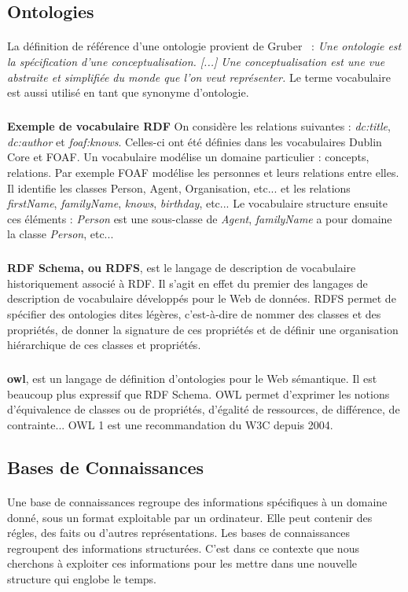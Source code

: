 \subsection{Ontologies}
\paragraph{}
La définition de référence d’une ontologie provient de Gruber~\cite{gruber1995}  : {\it Une ontologie est la spécification d’une conceptualisation. [...] Une conceptualisation est une vue abstraite et simplifiée du monde que l’on veut représenter.} Le terme vocabulaire est aussi utilisé en tant que synonyme d’ontologie.
\subparagraph{}
\textbf{Exemple de vocabulaire RDF} On considère les relations suivantes : \textit{dc:title}, \textit{dc:author} et \textit{foaf:knows}. Celles-ci ont été définies dans les vocabulaires Dublin Core et FOAF. Un vocabulaire modélise un domaine particulier : concepts, relations. Par exemple FOAF modélise les personnes et leurs relations entre elles. Il identifie les classes Person, Agent, Organisation, etc... et les relations \textit{firstName}, \textit{familyName}, \textit{knows}, \textit{birthday}, etc... Le vocabulaire structure ensuite ces  éléments : \textit{Person} est une sous-classe de \textit{Agent}, \textit{familyName} a pour domaine la classe \textit{Person}, etc...
\subparagraph{}
\textbf{RDF Schema, ou RDFS}, est le langage de description de vocabulaire historiquement associé à RDF. Il s'agit en effet du premier des langages de description de vocabulaire développés pour le Web de données. RDFS permet de spécifier des ontologies dites légères, c'est-à-dire de nommer des classes et des propriétés, de donner la signature de ces propriétés et de définir une organisation hiérarchique de ces classes et propriétés.
\subparagraph{}
\textbf{\gls{owl}}, est un langage de définition d'ontologies pour le Web sémantique. Il est beaucoup plus expressif que RDF Schema. OWL permet d'exprimer les notions d'équivalence de classes ou de propriétés, d'égalité de ressources, de différence, de contrainte... OWL 1 est une recommandation du W3C depuis 2004.
\newpage
\subsection{Bases de Connaissances}
\paragraph{}
Une base de connaissances regroupe des informations spécifiques à un domaine donné, sous un format exploitable par un ordinateur. Elle peut contenir des régles, des faits ou d'autres représentations. Les bases de connaissances regroupent des informations structurées. C’est dans ce contexte que nous cherchons à exploiter ces informations pour les mettre dans une nouvelle structure qui englobe le temps.
